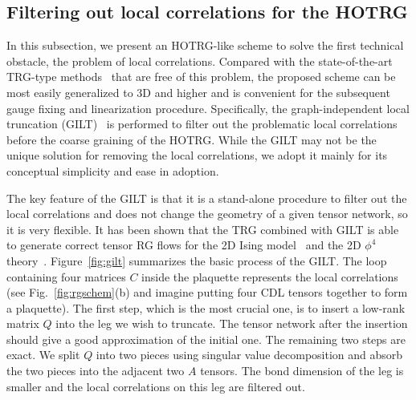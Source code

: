 \documentclass[aps,prr,reprint,superscriptaddress,nofootinbib,floatfix]{revtex4-2}
\begin{document}
\subsection{Filtering out local correlations for the HOTRG\label{sec:gilthotrg}}
In this subsection, we present an HOTRG-like scheme to solve the first technical obstacle, the problem of local correlations.
Compared with the state-of-the-art TRG-type methods~\cite{GuWen2009,tnr,tnralgo,tnrplus,looptnr,harada2018,fet,tns,tensor-ring,gilts} that are free of this problem, the proposed scheme can be most easily generalized to 3D and higher and is convenient for the subsequent gauge fixing and linearization procedure.
Specifically, the graph-independent local truncation (GILT)~\cite{gilts} is performed to filter out the problematic local correlations before the coarse graining of the HOTRG\@.
While the GILT may not be the unique solution for removing the local correlations, we adopt it mainly for its conceptual simplicity and ease in adoption.
%

The key feature of the GILT is that it is a stand-alone procedure to filter out the local correlations and does not change the geometry of a given tensor network, so it is very flexible.
It has been shown that the TRG combined with GILT is able to generate correct tensor RG flows for the 2D Ising model~\cite{gilts} and the 2D $\phi^4$ theory~\cite{Delcamp2020}.
Figure~\ref{fig:gilt} summarizes the basic process of the GILT. 
The loop containing four matrices $C$ inside the plaquette represents the local correlations (see Fig.~\ref{fig:rgschem}(b) and imagine putting four CDL tensors together to form a plaquette). 
The first step, which is the most crucial one, is to insert a low-rank matrix $Q$ into the leg we wish to truncate. 
The tensor network after the insertion should give a good approximation of the initial one.
The remaining two steps are exact. We split $Q$ into two pieces using singular value decomposition and absorb the two pieces into the adjacent two $A$ tensors. 
The bond dimension of the leg is smaller and the local correlations on this leg are filtered out. 
%
\end{document}
